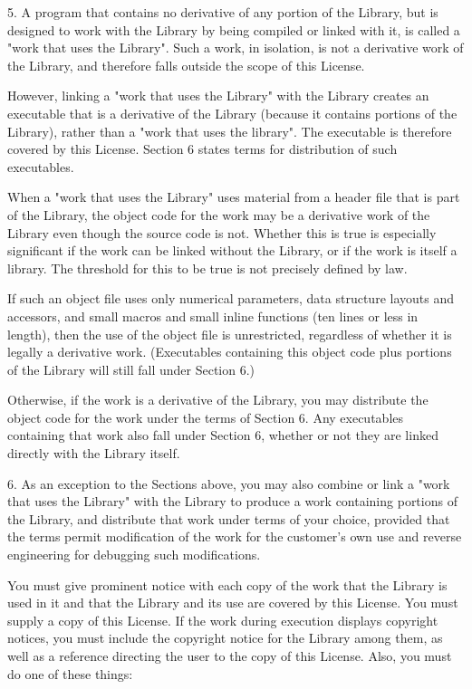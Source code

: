\begin{DoxyCode}
  5. A program that contains no derivative of any portion of the
Library, but is designed to work with the Library by being compiled or
linked with it, is called a "work that uses the Library".  Such a
work, in isolation, is not a derivative work of the Library, and
therefore falls outside the scope of this License.

  However, linking a "work that uses the Library" with the Library
creates an executable that is a derivative of the Library (because it
contains portions of the Library), rather than a "work that uses the
library".  The executable is therefore covered by this License.
Section 6 states terms for distribution of such executables.

  When a "work that uses the Library" uses material from a header file
that is part of the Library, the object code for the work may be a
derivative work of the Library even though the source code is not.
Whether this is true is especially significant if the work can be
linked without the Library, or if the work is itself a library.  The
threshold for this to be true is not precisely defined by law.

  If such an object file uses only numerical parameters, data
structure layouts and accessors, and small macros and small inline
functions (ten lines or less in length), then the use of the object
file is unrestricted, regardless of whether it is legally a derivative
work.  (Executables containing this object code plus portions of the
Library will still fall under Section 6.)

  Otherwise, if the work is a derivative of the Library, you may
distribute the object code for the work under the terms of Section 6.
Any executables containing that work also fall under Section 6,
whether or not they are linked directly with the Library itself.

  6. As an exception to the Sections above, you may also combine or
link a "work that uses the Library" with the Library to produce a
work containing portions of the Library, and distribute that work
under terms of your choice, provided that the terms permit
modification of the work for the customer's own use and reverse
engineering for debugging such modifications.

  You must give prominent notice with each copy of the work that the
Library is used in it and that the Library and its use are covered by
this License.  You must supply a copy of this License.  If the work
during execution displays copyright notices, you must include the
copyright notice for the Library among them, as well as a reference
directing the user to the copy of this License.  Also, you must do one
of these things:


\end{DoxyCode}

